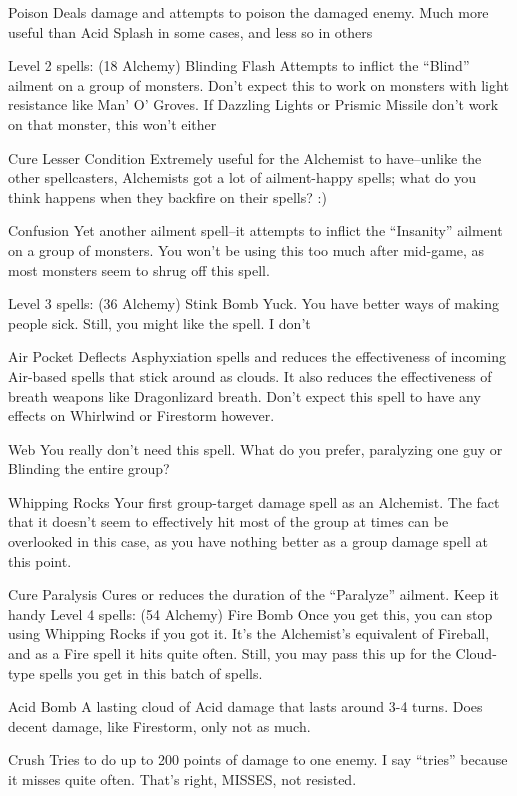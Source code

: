 \documentclass[12pt]{article}
\begin{document}
Poison Deals damage and attempts to poison the damaged enemy. Much more
useful than Acid Splash in some cases, and less so in others

Level 2 spells: (18 Alchemy) Blinding Flash Attempts to inflict the
``Blind'' ailment on a group of monsters. Don't expect this to work on
monsters with light resistance like Man' O' Groves. If Dazzling Lights
or Prismic Missile don't work on that monster, this won't either

Cure Lesser Condition Extremely useful for the Alchemist to have--unlike
the other spellcasters, Alchemists got a lot of ailment-happy spells;
what do you think happens when they backfire on their spells? :)

Confusion Yet another ailment spell--it attempts to inflict the
``Insanity'' ailment on a group of monsters. You won't be using this too
much after mid-game, as most monsters seem to shrug off this spell.

Level 3 spells: (36 Alchemy) Stink Bomb Yuck. You have better ways of
making people sick. Still, you might like the spell. I don't

Air Pocket Deflects Asphyxiation spells and reduces the effectiveness of
incoming Air-based spells that stick around as clouds. It also reduces
the effectiveness of breath weapons like Dragonlizard breath. Don't
expect this spell to have any effects on Whirlwind or Firestorm however.

Web You really don't need this spell. What do you prefer, paralyzing one
guy or Blinding the entire group?

Whipping Rocks Your first group-target damage spell as an Alchemist. The
fact that it doesn't seem to effectively hit most of the group at times
can be overlooked in this case, as you have nothing better as a group
damage spell at this point.

Cure Paralysis Cures or reduces the duration of the ``Paralyze''
ailment. Keep it handy Level 4 spells: (54 Alchemy) Fire Bomb Once you
get this, you can stop using Whipping Rocks if you got it. It's the
Alchemist's equivalent of Fireball, and as a Fire spell it hits quite
often. Still, you may pass this up for the Cloud-type spells you get in
this batch of spells.

Acid Bomb A lasting cloud of Acid damage that lasts around 3-4 turns.
Does decent damage, like Firestorm, only not as much.

Crush Tries to do up to 200 points of damage to one enemy. I say
``tries'' because it misses quite often. That's right, MISSES, not
resisted.
\end{document}
